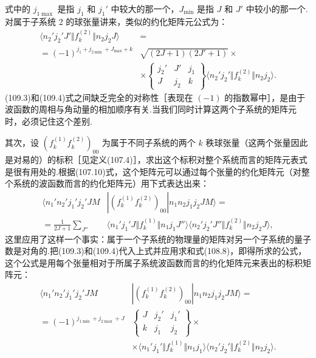 式中的 $j_{1\max}$ 是指 $j_1$ 和 $j_1'$ 中较大的那一个，$J_{\min}$ 是指 $J$ 和 $J'$ 中较小的那一个.对属于子系统 2 的球张量讲来，类似的约化矩阵元公式为：
\begin{equation}
\begin{aligned}
  \langle n_2'j_2'J'\Vert f^{(2)}_k\Vert n_2j_2J\rangle&=\\
  =(-1)^{j_1+j_{2\min}+J_{\max}+k}&\sqrt{(2J+1)(2J'+1)}\times\\
  &\times\left\{\begin{array}{ccc}j_2'&J'&j_1\\J&j_2&k\end{array}\right\}
  \langle n_2'j_2'\Vert f^{(2)}_k\Vert n_2j_2\rangle.
\end{aligned}
\end{equation}
(109.3)和(109.4)式之间缺乏完全的对称性［表现在 $(-1)$ 的指数幂中］，是由于波函数的周相与角动量的相加顺序有关.当我们同时计算这两个子系统的矩阵元时，必须记住这个差别.

其次，设 $(f^{(1)}_kf^{(2)}_k)_{00}$ 为属于不同子系统的两个 $k$ 秩球张量（这两个张量因此是对易的）的标积［见定义(107.4)］，求出这个标积对整个系统而言的矩阵元表式是很有用处的.根据(107.10)式，这个矩阵元可以通过每个张量的约化矩阵元（对整个系统的波函数而言的约化矩阵元）用下式表达出来：
\begin{equation*}
\begin{aligned}
  \langle n_1'n_2'j_1'j_2'JM&|(f^{(1)}_kf^{(2)}_k)_{00}|n_1n_2j_1j_2JM\rangle=\\
  =\frac{1}{2J+1}\sum_{J''}&\langle n_1'j_1'J\Vert f^{(1)}_k\Vert n_1j_1J''\rangle
  \langle n_2'j_2'J''\Vert f^{(2)}_k\Vert n_2j_2J\rangle,
\end{aligned}
\end{equation*}
这里应用了这样一个事实：属于一个子系统的物理量的矩阵对另一个子系统的量子数是对角的.把(109.3)和(109.4)代入上式并应用求和式(108.8)，即得所求的公式，这个公式是用每个张量相对于所属子系统波函数而言的约化矩阵元来表出的标积矩阵元：
\begin{equation}
\begin{aligned}
  \langle n_1'n_2'j_1'j_2'JM&|(f^{(1)}_kf^{(2)}_k)_{00}|n_1n_2j_1j_2JM\rangle=\\
  =(-1)^{j_{1\min}+j_{2\max}+J}&\left\{\begin{array}{ccc}J&j_2'&j_1'\\k&j_1&j_2\end{array}\right\}\times\\
  &\times\langle n_1'j_1'\Vert f^{(1)}_k\Vert n_1j_1\rangle
  \langle n_2'j_2'\Vert f^{(2)}_k\Vert n_2j_2\rangle.
\end{aligned}
\end{equation}

